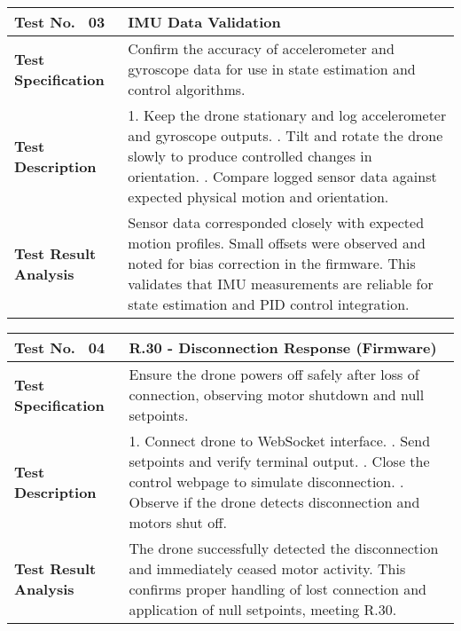 \begin{table}[H]
\centering
\renewcommand{\arraystretch}{1.2}
\begin{tabular}{|p{3.5cm}|p{12cm}|}
\hline
\textbf{Test No. \, 03} & \textbf{IMU Data Validation} \\ \hline
\textbf{Test Specification} & 
Confirm the accuracy of accelerometer and gyroscope data for use in state estimation and control algorithms. \\ \hline
\textbf{Test Description} & 
1. Keep the drone stationary and log accelerometer and gyroscope outputs. \newline
2. Tilt and rotate the drone slowly to produce controlled changes in orientation. \newline
3. Compare logged sensor data against expected physical motion and orientation. \\ \hline
\textbf{Test Result Analysis} & 
Sensor data corresponded closely with expected motion profiles. Small offsets were observed and noted for bias correction in the firmware. This validates that IMU measurements are reliable for state estimation and PID control integration. \\ \hline
\end{tabular}
\end{table}

\begin{table}[H]
\centering
\renewcommand{\arraystretch}{1.2}
\begin{tabular}{|p{3.5cm}|p{12cm}|}
\hline
\textbf{Test No. \, 04} & \textbf{R.30 - Disconnection Response} (Firmware) \\ \hline
\textbf{Test Specification} & 
Ensure the drone powers off safely after loss of connection, observing motor shutdown and null setpoints. \\ \hline
\textbf{Test Description} & 
1. Connect drone to WebSocket interface. \newline
2. Send setpoints and verify terminal output. \newline
3. Close the control webpage to simulate disconnection. \newline
4. Observe if the drone detects disconnection and motors shut off. \\ \hline
\textbf{Test Result Analysis} & 
The drone successfully detected the disconnection and immediately ceased motor activity. This confirms proper handling of lost connection and application of null setpoints, meeting R.30. \\ \hline
\end{tabular}
\end{table}

